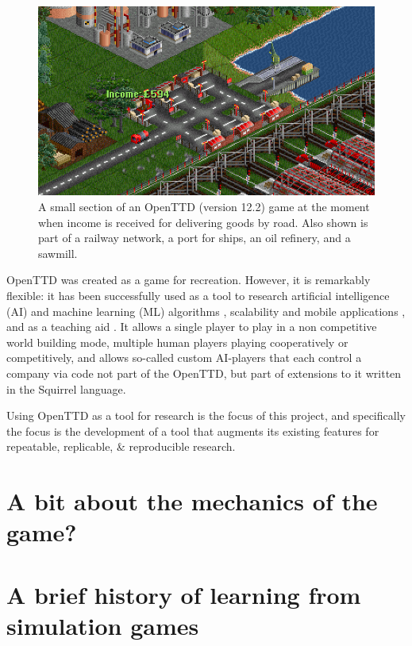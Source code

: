 \documentclass[logo,msc]{infthesis}           %
\begin{document}
\begin{figure}[h]
\centering
\includegraphics[width=\columnwidth]{assets/openttd-screenshot.png}
\caption{A small section of an OpenTTD (version 12.2) game at the moment when income is received for delivering goods by road. Also shown is part of a railway network, a port for ships, an oil refinery, and a sawmill.}
\label{fig:openttd}
\end{figure}


OpenTTD was created as a game for recreation. However, it is remarkably flexible: it has been successfully used as a tool to research artificial intelligence (AI) and machine learning (ML) algorithms \cite{wisniewski2011artificial, rios2009trains, bijlsma2014evolving}, scalability and mobile applications \cite{jiang2018mirroring}, and as a teaching aid \cite{HansenMuprhie2018}. It allows a single player to play in a non competitive world building mode, multiple human players playing cooperatively or competitively, and allows so-called custom AI-players that each control a company via code not part of the OpenTTD, but part of extensions to it written in the Squirrel language.

Using OpenTTD as a tool for research is the focus of this project, and specifically the focus is the development of a tool that augments its existing features for repeatable, replicable, \& reproducible research.

\section{A bit about the mechanics of the game?}

\section{A brief history of learning from simulation games}
\end{document}
